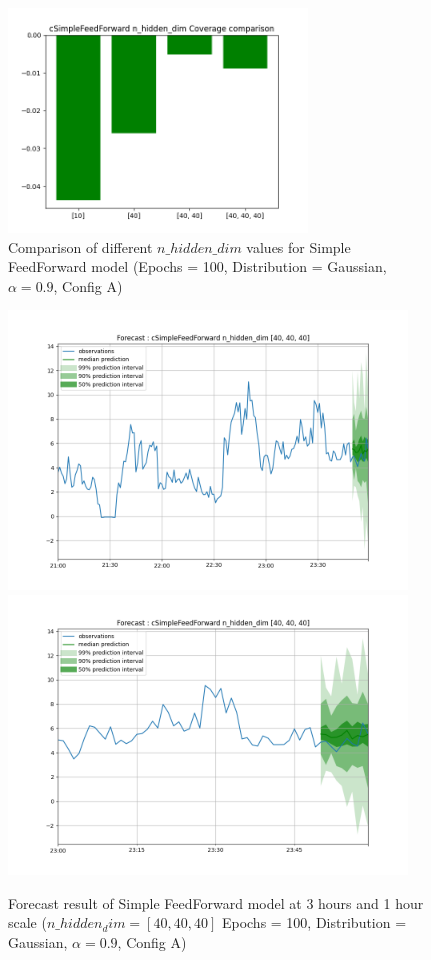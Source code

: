 \begin{figure}[H]
    \centering
    \includegraphics[width=300px]{plots/hist/a/cSimpleFeedForward/n_hidden_dim/Coverage.png}
    \caption{Comparison of different $n\_hidden\_dim$ values for Simple FeedForward model (Epochs = 100, Distribution = Gaussian, $\alpha = 0.9$, Config A)}
    \label{fig:comp_feedfordward}
\end{figure}

\begin{figure}[H]
    \centering
    \includegraphics[width=400px]{plots/forecast/a/cSimpleFeedForward/n_hidden_dim/[40, 40, 40]/180.png}
    \includegraphics[width=400px]{plots/forecast/a/cSimpleFeedForward/n_hidden_dim/[40, 40, 40]/60.png}
    \caption{Forecast result of Simple FeedForward model at 3 hours and 1 hour scale ($n\_hidden_dim = [40,40,40]$ Epochs = 100, Distribution = Gaussian, $\alpha = 0.9$, Config A)}
    \label{fig:feedfordward}
\end{figure}



